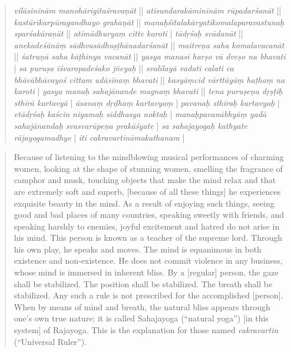 \begin{quote}
\textit{vilāsinīnām manohārigītaśravaṇāt} || \textit{atisundarakāminīnām rūpadarśanāt} || \textit{kastūrīkarpūragandhayo grahaṇāt} || \textit{manaḥśītalakāryatikomalaparavastunaḥ sparśakāraṇāt} || \textit{atimādhuryaṃ citte karoti} | \textit{tādṛśaḥ svādanāt} || \textit{anekadeśānāṃ sādhvasādhuṣṭhānadarśanāt} || \textit{maitreṇa saha komalavacanāt} || \textit{śatruṇā saha kāṭhinya vacanāt} || \textit{yasya manasi harṣo vā dveṣo na bhavati} | \textit{sa puruṣa īśvaropadeśako jñeyaḥ} || \textit{svalīlayā vadati calati ca bhāvābhāvayoś cittam udāsīnaṃ bhavati} || \textit{kasyāṃcid vārttāyāṃ haṭhaṃ na karoti} | \textit{yasya manaḥ sahajānande magnaṃ bhavati} || \textit{tena puruṣeṇa dṛṣṭiḥ sthirā kartavyā} | \textit{āsanaṃ dṛḍhaṃ kartavyaṃ} | \textit{pavanaḥ sthiraḥ kartavyaḥ} | \textit{etādṛśaḥ kaścin niyamaḥ siddhasya noktaḥ} | \textit{manaḥpavanābhyāṃ yadā sahajānandaḥ svasvarūpeṇa prakāśyate} | \textit{sa sahajayogaḥ kathyate rājayogamadhye} | \textit{iti cakravartināmakathanam} |
\end{quote}

\begin{quote}
Because of listening to the mindblowing musical performances of charming women, looking at the shape of stunning women, smelling the fragrance of camphor and musk, touching objects that make the mind relax and that are extremely soft and superb, [because of all these things] he experiences exquisite beauty in the mind. As a result of enjoying such things, seeing good and bad places of many countries, speaking sweetly with friends, and speaking harshly to enemies, joyful excitement and hatred do not arise in his mind. This person is known as a teacher of the supreme lord. Through his own play, he speaks and moves. The mind is equanimous in both existence and non-existence. He does not commit violence in any business, whose mind is immersed in inherent bliss. By a [regular] person, the gaze shall be stabilized. The position shall be stabilized. The breath shall be stabilized. Any such a rule is not prescribed for the accomplished [person]. When by means of mind and breath, the natural bliss appears through one’s own true nature; it is called Sahajayoga (``natural yoga'') [in this system] of Rajayoga. This is the explanation for those named \textit{cakravartin} (``Universal Ruler''). 
\end{quote}

